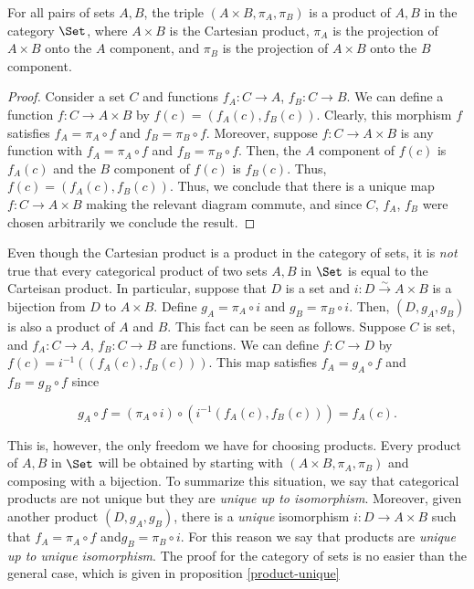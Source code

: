 \begin{prop}\label{product-in-set} For all pairs of sets $A,B$, the triple $(A\times B,\pi_A,\pi_B)$ is a product of $A,B$ in the category $\Set$, where $A\times B$ is the Cartesian product, $\pi_A$ is the projection of $A\times B$ onto the $A$ component, and $\pi_B$ is the projection of $A\times B$ onto the $B$ component.
\end{prop}
\begin{proof} Consider a set $C$ and functions $f_A:C\to A$, $f_B:C\to B$. We can define a function $f:C\to A\times B$ by $f(c)=(f_A(c),f_B(c))$. Clearly, this morphism $f$ satisfies $f_A=\pi_A\circ f$ and $f_B=\pi_B\circ f$. Moreover, suppose $f:C\to A\times B$ is any function with $f_A=\pi_A\circ f$ and $f_B=\pi_B\circ f$. Then, the $A$ component of $f(c)$ is $f_A(c)$ and the $B$ component of $f(c)$ is $f_B(c)$. Thus, $f(c)=(f_A(c),f_B(c))$. Thus, we conclude that there is a unique map $f:C\to A\times B$ making the relevant diagram commute, and since $C$, $f_A$, $f_B$ were chosen arbitrarily we conclude the result.
\end{proof}

\begin{rem} Even though the Cartesian product is a product in the category of sets, it is {\em not} true that every categorical product of two sets $A,B$ in $\Set$ is equal to the Carteisan product. In particular, suppose that $D$ is a set and $i:D\xrightarrow{\sim}A\times B$ is a bijection from $D$ to $A\times B$. Define $g_A=\pi_A\circ i$ and $g_B=\pi_B\circ i$. Then, $(D,g_A,g_B)$ is also a product of $A$ and $B$. This fact can be seen as follows. Suppose $C$ is set, and $f_A:C\to A$, $f_B:C\to B$ are functions. We can define $f:C\to D$ by $f(c)=i^{-1}((f_A(c),f_B(c)))$. This map satisfies $f_A=g_A\circ f$ and $f_B=g_B\circ f$ since

$$g_A\circ f =(\pi_A\circ i)\circ (i^{-1}(f_A(c),f_B(c)))=f_A(c).$$

This is, however, the only freedom we have for choosing products. Every product of $A,B$ in $\Set$ will be obtained by starting with $(A\times B,\pi_A,\pi_B)$ and composing with a bijection. To summarize this situation, we say that categorical products are not unique but they are {\em unique up to isomorphism}. Moreover, given another product $(D,g_A,g_B)$, there is a {\em unique} isomorphism $i:D\to A\times B$ such that $f_A=\pi_A\circ f$ and$g_B=\pi_B\circ i$. For this reason we say that products are {\em unique up to unique isomorphism}. The proof for the category of sets is no easier than the general case, which is given in proposition \ref{product-unique}
\end{rem}

